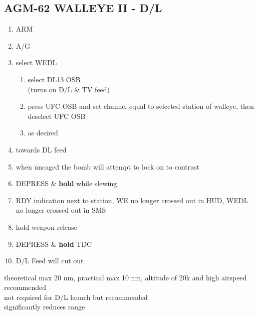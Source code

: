 \documentclass[fontInter, widesubsec]{TechCheck}
\begin{document}
	\subsection{AGM-62 WALLEYE II - D/L}
	\begin{enumerate}
		\item {}\dotfill ARM
		\item {}\dotfill A/G
		\item {}\dotfill select WEDL
		\begin{enumerate}
			\item {}\dotfill select DL13 OSB\\
			\hfill  (turns on D/L \& TV feed)
			\item {}\dotfill press UFC OSB and set channel equal to selected station of walleye, then deselect UFC OSB
			\item {}\dotfill as desired
		\end{enumerate}
		\item {}\dotfill towards DL feed
		\item {}\dotfill when uncaged the bomb will attempt to lock on to contrast
		\item {}\dotfill DEPRESS \& \textbf{hold} while slewing
		\item {}\dotfill RDY indication next to station, WE no longer crossed out in HUD, WEDL no longer crossed out in SMS
		\item {}\dotfill hold weapon release
		\item {}\dotfill DEPRESS \& \textbf{hold} TDC
		\item {}\dotfill D/L Feed will cut out
	\end{enumerate}
	 theoretical max 20 nm, practical max 10 nm,
	altitude of 20k and high airspeed recommended \\
	 not required for D/L launch but recommended \\
	 significantly reduces range

	\thumbnar
\end{document}
